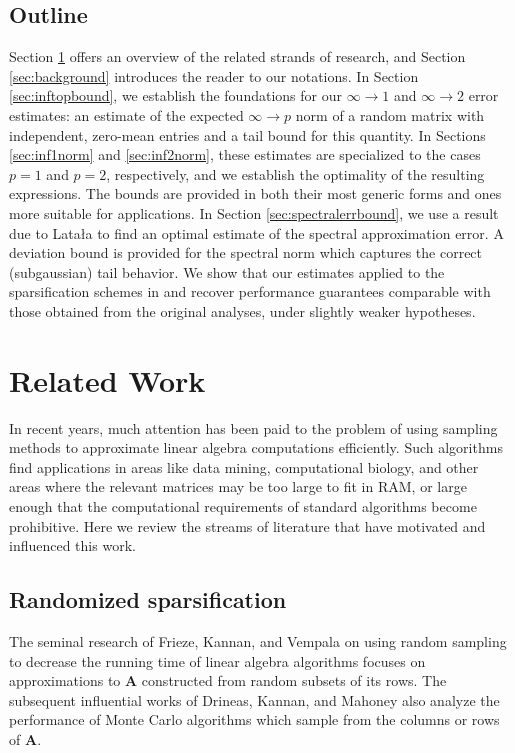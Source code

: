 \documentclass[11pt,letterpaper,twoside,reqno]{amsart}
\newcommand{\mat}[1]{\ensuremath{\bm{#1}}}
\newcommand{\infone}{\ensuremath{\infty\!\rightarrow\!\!1}}
\newcommand{\inftwo}{\ensuremath{\infty\!\rightarrow\!\!2}}
\newcommand{\infp}{\ensuremath{\infty\!\rightarrow\!p}}
\begin{document}
\subsection{Outline}

Section \ref{sec:literature} offers an overview of the related strands of research, and Section \ref{sec:background} introduces the reader to our notations. In Section \ref{sec:inftopbound}, we establish the foundations for our $\infone$ and $\inftwo$ error estimates: an estimate of the expected $\infp$ norm of a random matrix with independent, zero-mean entries and a tail bound for this quantity. In Sections \ref{sec:inf1norm} and \ref{sec:inf2norm}, these estimates are specialized to the cases $p=1$ and $p=2$, respectively, and we establish the optimality of the resulting expressions. The bounds are provided in both their most generic forms and ones more suitable for applications. In Section \ref{sec:spectralerrbound}, we use a result due to Lata\l{}a \cite{Lat04} to find an optimal estimate of the spectral approximation error. A deviation bound is provided for the spectral norm which captures the correct (subgaussian) tail behavior. We show that our estimates applied to the sparsification schemes in \cite{AHK06} and \cite{AM07} recover performance guarantees comparable with those obtained from the original analyses, under slightly weaker hypotheses.


\section{Related Work}
\label{sec:literature}

In recent years, much attention has been paid to the problem of using sampling methods to approximate linear algebra computations efficiently. Such algorithms find applications in areas like data mining, computational biology, and other areas where the relevant matrices may be too large
to fit in RAM, or large enough that the computational requirements of standard algorithms become prohibitive. Here we review the streams of literature that have motivated and influenced this work.

\subsection{Randomized sparsification}
The seminal research of Frieze, Kannan, and Vempala \cite{FKV98,FKV04} on using random sampling to decrease the running time of linear algebra algorithms focuses on approximations to $\mat{A}$ constructed from random subsets of its rows. The subsequent influential works of Drineas, Kannan, and Mahoney \cite{DKM06a,DKM06b, DKM06c} also analyze the performance of Monte Carlo algorithms which sample from the columns or rows of $\mat{A}$. 
\end{document}
